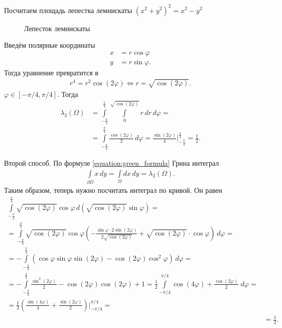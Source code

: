 \begin{exmpl}
 Посчитаем площадь лепестка лемнискаты $\left( x^{2} + y^{2} \right)^2 = x^{2} - y^{2}$

\begin{figure}[ht]
    \centering
    \caption{Лепесток лемнискаты}
    \label{fig:lepestok_lemniskati}
\end{figure}

Введём полярные координаты
\begin{align*}
 x &= r \cos\varphi \\
 y &= r \sin\varphi
.\end{align*} Тогда уравнение превратится в \begin{align*}
r^{4} = r^{2} \cos (2 \varphi) \iff r = \sqrt{ \cos (2 \varphi) }
.\end{align*} $\varphi \in [-\pi / 4, \pi / 4]$. Тогда
\begin{align*}
 \lambda_2(\Omega) &= \int\limits_{-\frac{\pi}{4}}^{\frac{\pi}{4}} \int\limits_{0}^{\sqrt{\cos(2\varphi)}} r  \, dr  \, d\varphi  = \\
&= \int\limits_{-\frac{\pi}{4}}^{\frac{\pi}{4}} \frac{\cos(2\varphi)}{2} \, d\varphi = \frac{\sin (2\varphi)}{4} \bigg\rvert_{-\frac{\pi}{4}} ^{\frac{\pi}{4}} = \frac{1}{2}
.\end{align*} 

Второй способ. По формуле \eqref{equation:green_formula} Грина интеграл
\begin{align*}
\int\limits_{\partial \overline \Omega} x \, dy = \int\limits_{\Omega} dx \, dy = \lambda_2(\Omega)
.\end{align*} Таким образом, теперь нужно посчитать интеграл по кривой. Он равен
\begin{align*}
 \int\limits_{-\frac{\pi}{4}}^{\frac{\pi}{4}} \sqrt{\cos(2\varphi)} \cos \varphi \, d \left( \sqrt{\cos(2\varphi)} \sin\varphi\right) = \\
 = \int\limits_{-\frac{\pi}{4}}^{\frac{\pi}{4}} \sqrt{\cos(2\varphi)} \cos\varphi \left( -\frac{\sin\varphi \cdot 2\sin(2\varphi)}{2\sqrt{\cos(2\varphi)}} + \sqrt{\cos(2\varphi)} \cdot \cos\varphi \right) \, d\varphi = \\
 = -\int\limits_{-\frac{\pi}{4}}^{\frac{\pi}{4}} \left( \cos\varphi \sin\varphi \sin(2 \varphi) - \cos(2\varphi) \cos^{2}\varphi \right) \, d\varphi  = \\
 = - \int\limits_{-\frac{\pi}{4}}^{\frac{\pi}{4}} \frac{\sin^{2}(2\varphi)}{2} - \cos(2\varphi)\cos(2\varphi)+1
 = \frac{1}{2} \int\limits_{-\pi / 4}^{\pi / 4} \cos(4 \varphi) + \frac{\cos(2\varphi)}{2} \; d\varphi = \\
 = \frac{1}{2} \left( \frac{\sin(4 \varphi)}{4} + \frac{\sin(2\varphi)}{2} \right)\bigg\rvert_{-\pi / 4}^{\pi / 4} = \\
 &= \frac{1}{2}
.\end{align*} 
\end{exmpl}


